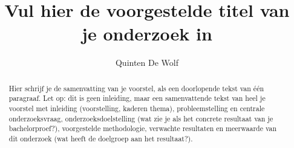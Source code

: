 \documentclass{hogent-article}
\title{Vul hier de voorgestelde titel van je onderzoek in}
\author{Quinten De Wolf}
\begin{document}
\begin{abstract}
  Hier schrijf je de samenvatting van je voorstel, als een doorlopende tekst van één paragraaf. Let op: dit is geen inleiding, maar een samenvattende tekst van heel je voorstel met inleiding (voorstelling, kaderen thema), probleemstelling en centrale onderzoeksvraag, onderzoeksdoelstelling (wat zie je als het concrete resultaat van je bachelorproef?), voorgestelde methodologie, verwachte resultaten en meerwaarde van dit onderzoek (wat heeft de doelgroep aan het resultaat?).
\end{abstract}

\tableofcontents



\printbibliography[heading=bibintoc]
\end{document}
